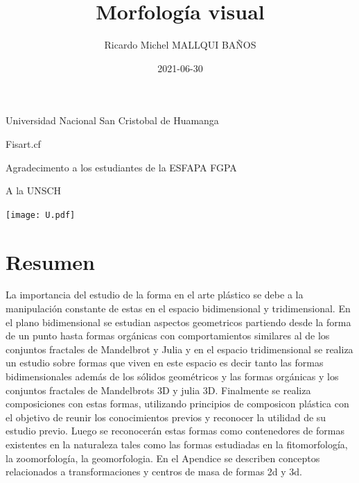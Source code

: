 \documentclass[16pt,]{krantz}
\title{Morfología visual}
\author{Ricardo Michel MALLQUI BAÑOS}
\institute{Universidad Nacional San Cristóbal De Huamanga}
\date{2021-06-30}
\theoremstyle{definition}
\theoremstyle{definition}
\theoremstyle{definition}
\theoremstyle{definition}
\theoremstyle{remark}
\begin{document}
\maketitle

\thispagestyle{empty}
\begin{flushright}
Universidad Nacional San Cristobal de Huamanga

Fisart.cf

Agradecimento a los estudiantes de la ESFAPA FGPA

A la UNSCH

\texttt{[image: U.pdf]}
\end{flushright}

{
\hypersetup{linkcolor=}
\setcounter{tocdepth}{2}
\tableofcontents
}
\listoftables
\listoffigures
\newcommand{\N}{\mathbb{N}}
\newcommand{\R}{\mathbb{R}}
\newcommand{\CC}{\mathbb{C}}
\newcommand{\I}{\mathbb{I}}
\newcommand{\f}{\mathbb{f}}
\newcommand{\X}{\mathbb{X}}
\newcommand{\D}{\mathbb{D}}
\newcommand{\Z}{\mathbb{Z}}
\newcommand{\Q}{\mathbb{Q}}
\newcommand{\norm}[1]{\left\Vert#1\right\Vert}
\newcommand{\abs}[1]{\left\vert#1\right\vert}
\newcommand{\set}[1]{\left\{#1\right\}}
\newcommand{\seq}[1]{\left<#1\right>}
\newcommand{\co}[1]{\left[#1\right]}
\newcommand{\cc}[1]{\left(#1\right)}
\newcommand{\J}{\mathcal{J}}
\newcommand{\K}{\mathcal{K}}
\newcommand{\M}{\mathcal{M}}
\newcommand{\F}{\mathcal{F}}

\hypertarget{resumen}{%
\chapter*{Resumen}\label{resumen}}


La importancia del estudio de la forma en el arte plástico se debe a la manipulación constante de estas en el espacio bidimensional y tridimensional. En el plano bidimensional se estudian aspectos geometricos partiendo desde la forma de un punto hasta formas orgánicas con comportamientos similares al de los conjuntos fractales de Mandelbrot y Julia y en el espacio tridimensional se realiza un estudio sobre formas que viven en este espacio es decir tanto las formas bidimensionales además de los sólidos geométricos y las formas orgánicas y los conjuntos fractales de Mandelbrots 3D y julia 3D. Finalmente se realiza composiciones con estas formas, utilizando principios de composicon plástica con el objetivo de reunir los conocimientos previos y reconocer la utilidad de su estudio previo. Luego se reconocerán estas formas como contenedores de formas existentes en la naturaleza tales como las formas estudiadas en la fitomorfología, la zoomorfología, la geomorfologia. En el Apendice se describen conceptos relacionados a transformaciones y centros de masa de formas 2d y 3d.
\end{document}
